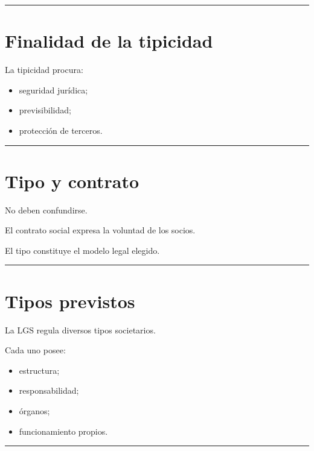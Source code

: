\documentclass[
  spanish,
  letterpaper,
  DIV=11,
  numbers=noendperiod]{scrartcl}
\providecommand{\tightlist}{%
  \setlength{\itemsep}{0pt}\setlength{\parskip}{0pt}}
\begin{document}
\begin{center}\rule{0.5\linewidth}{0.5pt}\end{center}

\section{Finalidad de la tipicidad}\label{finalidad-de-la-tipicidad}

La tipicidad procura:

\begin{itemize}
\tightlist
\item
  seguridad jurídica;
\item
  previsibilidad;
\item
  protección de terceros.
\end{itemize}

\begin{center}\rule{0.5\linewidth}{0.5pt}\end{center}

\section{Tipo y contrato}\label{tipo-y-contrato}

No deben confundirse.

El contrato social expresa la voluntad de los socios.

El tipo constituye el modelo legal elegido.

\begin{center}\rule{0.5\linewidth}{0.5pt}\end{center}

\section{Tipos previstos}\label{tipos-previstos}

La LGS regula diversos tipos societarios.

Cada uno posee:

\begin{itemize}
\tightlist
\item
  estructura;
\item
  responsabilidad;
\item
  órganos;
\item
  funcionamiento propios.
\end{itemize}

\begin{center}\rule{0.5\linewidth}{0.5pt}\end{center}
\end{document}
